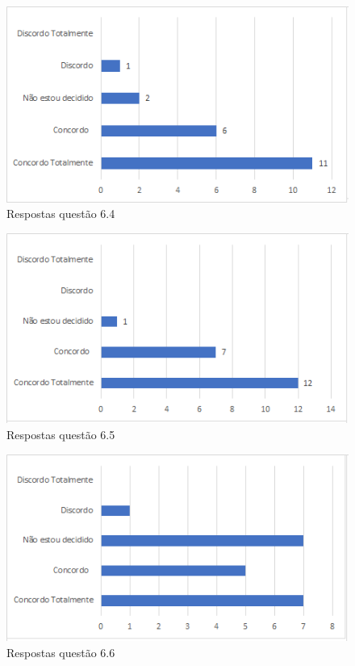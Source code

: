 \begin{figure}[!t]
\centering
\includegraphics[scale=0.7]{figuras das questoes/6.4.png}
\caption{Respostas questão 6.4}
\end{figure}

\begin{figure}[!t]
\centering
\includegraphics[scale=0.7]{figuras das questoes/6.5.png}
\caption{Respostas questão 6.5}
\end{figure}

\begin{figure}[!t]
\centering
\includegraphics[scale=0.7]{figuras das questoes/6.6.png}
\caption{Respostas questão 6.6}
\end{figure}

